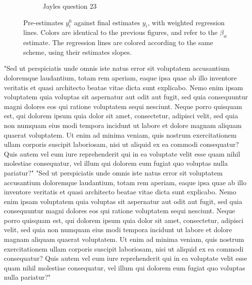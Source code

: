 \documentclass[10pt,a4paper,twocolumn,lineno]{article}
\begin{document}
\begin{figure}[htbp]
\begin{subfigure}[b]{.24\textwidth}
		\caption{Jayles question 23}
	\end{subfigure}
	\caption{Pre-estimates $y_i^0$ against final estimates $y_i$, with weighted regression lines. Colors are identical to the previous figures, and refer to the $\beta_w$ estimate. The regression lines are colored according to the same scheme, using their estimates slopes.}\label{fig: Jayles estimate vs pre-estimate}
\end{figure}

"Sed ut perspiciatis unde omnis iste natus error sit voluptatem accusantium doloremque laudantium, totam rem aperiam, eaque ipsa quae ab illo inventore veritatis et quasi architecto beatae vitae dicta sunt explicabo. Nemo enim ipsam voluptatem quia voluptas sit aspernatur aut odit aut fugit, sed quia consequuntur magni dolores eos qui ratione voluptatem sequi nesciunt. Neque porro quisquam est, qui dolorem ipsum quia dolor sit amet, consectetur, adipisci velit, sed quia non numquam eius modi tempora incidunt ut labore et dolore magnam aliquam quaerat voluptatem. Ut enim ad minima veniam, quis nostrum exercitationem ullam corporis suscipit laboriosam, nisi ut aliquid ex ea commodi consequatur? Quis autem vel eum iure reprehenderit qui in ea voluptate velit esse quam nihil molestiae consequatur, vel illum qui dolorem eum fugiat quo voluptas nulla pariatur?"
"Sed ut perspiciatis unde omnis iste natus error sit voluptatem accusantium doloremque laudantium, totam rem aperiam, eaque ipsa quae ab illo inventore veritatis et quasi architecto beatae vitae dicta sunt explicabo. Nemo enim ipsam voluptatem quia voluptas sit aspernatur aut odit aut fugit, sed quia consequuntur magni dolores eos qui ratione voluptatem sequi nesciunt. Neque porro quisquam est, qui dolorem ipsum quia dolor sit amet, consectetur, adipisci velit, sed quia non numquam eius modi tempora incidunt ut labore et dolore magnam aliquam quaerat voluptatem. Ut enim ad minima veniam, quis nostrum exercitationem ullam corporis suscipit laboriosam, nisi ut aliquid ex ea commodi consequatur? Quis autem vel eum iure reprehenderit qui in ea voluptate velit esse quam nihil molestiae consequatur, vel illum qui dolorem eum fugiat quo voluptas nulla pariatur?"
\end{document}
